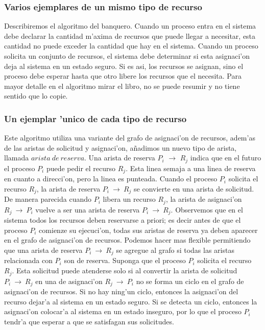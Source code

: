\subsubsection{Varios ejemplares de un mismo tipo de recurso}
Describiremos el algoritmo del banquero.
Cuando un proceso entra en el sistema debe declarar la cantidad m'axima de recursos que puede llegar a necesitar, esta cantidad no puede exceder la cantidad que hay en el sistema. Cuando un proceso solicita un conjunto de recursos, el sistema debe determinar si esta asignaci'on deja al sistema en un estado seguro. Si es asi, los recursos se asignan, sino el proceso debe esperar hasta que otro libere los recursos que el necesita. Para mayor detalle en el algoritmo mirar el libro, no se puede resumir y no tiene sentido que lo copie.

\subsubsection{Un ejemplar 'unico de cada tipo de recurso}
Este algoritmo utiliza una variante del grafo de asignaci'on de recursos, adem'as de las aristas de solicitud y asignaci'on, añadimos un nuevo tipo de arista, llamada $arista\ de\ reserva$. Una arista de reserva $P_{i}$ $\rightarrow$ $R_{j}$ indica que en el futuro el proceso $P_{i}$ puede pedir el recurso $R_{j}$. Esta linea semaja a una linea de reserva en cuanto a direcci'on, pero la linea es punteada. Cuando el proceso $P_{i}$ solicita el recurso $R_{j}$, la arista de reserva $P_{i}\ \rightarrow\ R_{j}$ se convierte en una arista de solicitud. De manera parecida cuando $P_{i}$ libera un recurso $R_{j}$, la arista de asignaci'on $R_{j}\ \rightarrow\ P_{i}$ vuelve a ser una arista de reserva $P_{i}\ \rightarrow\ R_{j}$. Observemos que en el sistema todos los recursos deben reservarse a priori; es decir antes de que el proceso $P_{i}$ comienze su ejecuci'on, todas sus aristas de reserva ya deben aparecer en el grafo de asignaci'on de recursos. Podemos hacer mas flexible permitiendo que una arista de reserva $P_{i}\ \rightarrow\ R_{j}$ se agregue al grafo si todas las aristas relacionada con $P_{i}$ son de reserva.
Suponga que el proceso $P_{i}$ solicita el recurso $R_{j}$. Esta solicitud puede atenderse solo si al convertir la arista de solicitud $P_{i}\ \rightarrow\ R_{j}$ en una de asignaci'on $R_{j}\ \rightarrow\ P_{i}$ no se forma un ciclo en el grafo de asignaci'on de recursos.
Si no hay ning'un ciclo, entonces la asignaci'on del recurso dejar'a al sistema en un estado seguro. Si se detecta un ciclo, entonces la asignaci'on colocar'a al sistema en un estado inseguro, por lo que el proceso $P_{i}$ tendr'a que esperar a que se satisfagan sus solicitudes.

